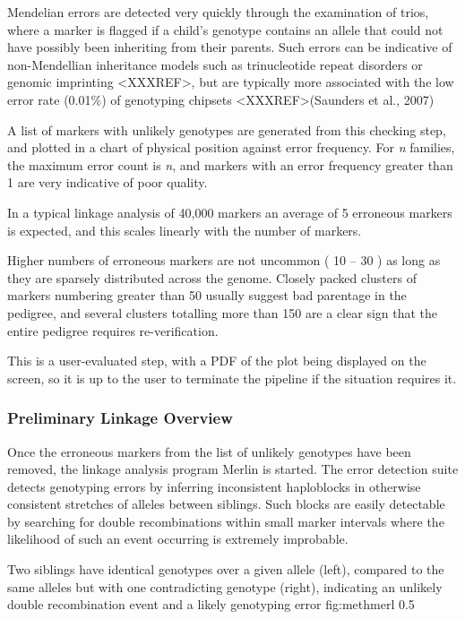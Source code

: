 Mendelian errors are detected very quickly through the examination of trios, where a marker is flagged if a child's genotype contains an allele that could not have possibly been inheriting from their parents.  Such errors can be indicative of non-Mendellian inheritance models such as trinucleotide repeat disorders or genomic imprinting <XXXREF>, but are typically more associated with the low error rate (0.01\%) of genotyping chipsets <XXXREF>(Saunders et al., 2007)

A list of markers with unlikely genotypes are generated from this checking step, and plotted in a chart of physical position against error frequency. For \textit{n} families, the maximum error count is \textit{n}, and markers with an error frequency greater than 1 are very indicative of poor quality.

In a typical linkage analysis of 40,000 markers an average of 5 erroneous markers is expected, and this scales linearly with the number of markers.

Higher numbers of erroneous markers are not uncommon ( 10 – 30 ) as long as they are sparsely distributed across the genome. Closely packed clusters of markers numbering greater than 50 usually suggest bad parentage in the pedigree, and several clusters totalling more than 150 are a clear sign that the entire pedigree requires re-verification.

This is a user-evaluated step, with a PDF of the plot being displayed on the screen, so it is up to the user to terminate the pipeline if the situation requires it.


\subsubsection{Preliminary Linkage Overview}

Once the erroneous markers from the list of unlikely genotypes have been removed, the linkage analysis program \gls{Merlin} is started. The error detection  suite detects genotyping errors by inferring inconsistent haploblocks in otherwise consistent stretches of alleles between siblings. Such blocks are easily detectable by searching for double recombinations within small marker intervals where the likelihood of such an event occurring is extremely improbable.

	{Two siblings have identical genotypes over a given allele (left), compared to the same alleles but with one contradicting genotype (right), indicating an unlikely double recombination event and a likely genotyping error}
	{fig:methmerl}
	{0.5}

